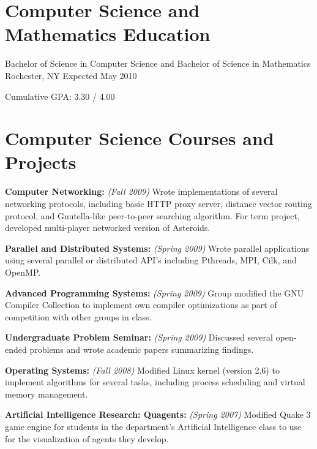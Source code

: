 \documentclass[letterpaper]{resume}
\begin{document}
\section{Computer Science and Mathematics Education}

            {Bachelor of Science in Computer Science and Bachelor of Science in Mathematics}
			{Rochester, NY}
			{Expected May 2010}

\begin{compactitem}
	\item Cumulative GPA: 3.30 / 4.00 \par
\end{compactitem}

\section{Computer Science Courses and Projects}
\vspace{\secskip}

\begin{compactitem}
	\item \textbf{Computer Networking:} \textit{(Fall 2009)} Wrote implementations of several networking protocols, including basic HTTP proxy server, distance vector routing protocol, and Gnutella-like peer-to-peer searching algorithm. For term project, developed multi-player networked version of Asteroids. \par
	
	\item \textbf{Parallel and Distributed Systems:} \textit{(Spring 2009)} Wrote parallel applications using several parallel or distributed API's including Pthreads, MPI, Cilk, and OpenMP. \par

	\item \textbf{Advanced Programming Systems:} \textit{(Spring 2009)} Group modified the GNU Compiler Collection to implement own compiler optimizations as part of competition with other groups in class. \par

	\item \textbf{Undergraduate Problem Seminar:} \textit{(Spring 2009)} Discussed several open-ended problems and wrote academic papers summarizing findings. \par
	
	\item \textbf{Operating Systems:} \textit{(Fall 2008)} Modified Linux kernel (version 2.6) to implement algorithms for several tasks, including process scheduling and virtual memory management. \par
	
	\item \textbf{Artificial Intelligence Research: Quagents:} \textit{(Spring 2007)} Modified Quake 3 game engine for students in the department's Artificial Intelligence class to use for the visualization of agents they develop. \par
\end{compactitem}
\end{document}
